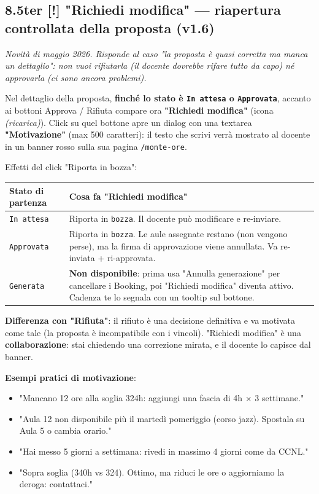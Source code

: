 \documentclass[11pt,a4paper]{article}
\renewenvironment{quote}
  {\begin{list}{}{%
      \setlength{\leftmargin}{8pt}%
      \setlength{\rightmargin}{8pt}%
      \setlength{\topsep}{6pt}%
      \setlength{\parsep}{0pt}}%
      \item\relax\color{black!75}\itshape}
  {\end{list}}
\begin{document}
\subsection{8.5ter \textbf{[!]} "Richiedi modifica" --- riapertura controllata della proposta (v1.6)}


\begin{quote}
Novità di maggio 2026. Risponde al caso "la proposta è quasi corretta ma manca un dettaglio": non vuoi rifiutarla (il docente dovrebbe rifare tutto da capo) né approvarla (ci sono ancora problemi).
\end{quote}

Nel dettaglio della proposta, \textbf{finché lo stato è \texttt{In attesa} o \texttt{Approvata}}, accanto ai bottoni Approva / Rifiuta compare ora \textbf{"Richiedi modifica"} (icona \textit{(ricarica)}). Click su quel bottone apre un dialog con una textarea \textbf{"Motivazione"} (max 500 caratteri): il testo che scrivi verrà mostrato al docente in un banner rosso sulla sua pagina \texttt{/monte-ore}.

Effetti del click "Riporta in bozza":

\begin{table}[H]
\centering
\small
\begin{tabularx}{\linewidth}{|X|X|}
\hline
\rowcolor{tableheader} Stato di partenza & Cosa fa "Richiedi modifica" \\
\hline
\texttt{In attesa} & Riporta in \texttt{bozza}. Il docente può modificare e re-inviare. \\
\hline
\texttt{Approvata} & Riporta in \texttt{bozza}. Le aule assegnate restano (non vengono perse), ma la firma di approvazione viene annullata. Va re-inviata + ri-approvata. \\
\hline
\texttt{Generata} & \textbf{Non disponibile}: prima usa "Annulla generazione" per cancellare i Booking, poi "Richiedi modifica" diventa attivo. Cadenza te lo segnala con un tooltip sul bottone. \\
\hline
\end{tabularx}
\end{table}


\textbf{Differenza con "Rifiuta"}: il rifiuto è una decisione definitiva e va motivata come tale (la proposta è incompatibile con i vincoli). "Richiedi modifica" è una \textbf{collaborazione}: stai chiedendo una correzione mirata, e il docente lo capisce dal banner.

\textbf{Esempi pratici di motivazione}:

\begin{itemize}
  \item "Mancano 12 ore alla soglia 324h: aggiungi una fascia di 4h × 3 settimane."
  \item "Aula 12 non disponibile più il martedì pomeriggio (corso jazz). Spostala su Aula 5 o cambia orario."
  \item "Hai messo 5 giorni a settimana: rivedi in massimo 4 giorni come da CCNL."
  \item "Sopra soglia (340h vs 324). Ottimo, ma riduci le ore o aggiorniamo la deroga: contattaci."
\end{itemize}
\end{document}
